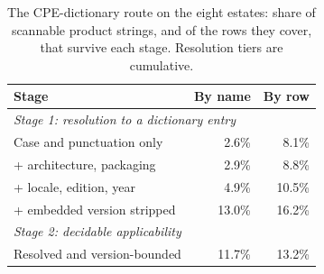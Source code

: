 \begin{table}[htbp]
\centering
\caption{The CPE-dictionary route on the eight estates: share of scannable product strings, and of the rows they cover, that survive each stage. Resolution tiers are cumulative.}
\label{tab:cpe-route}
\footnotesize
\begin{tabular}{l r r}
\hline
Stage & By name & By row \\
\hline
\multicolumn{3}{l}{\textit{Stage 1: resolution to a dictionary entry}} \\
Case and punctuation only & 2.6\% & 8.1\% \\
\quad + architecture, packaging & 2.9\% & 8.8\% \\
\quad + locale, edition, year & 4.9\% & 10.5\% \\
\quad + embedded version stripped & 13.0\% & 16.2\% \\
\multicolumn{3}{l}{\textit{Stage 2: decidable applicability}} \\
Resolved and version-bounded & 11.7\% & 13.2\% \\
\hline
\end{tabular}
\end{table}
